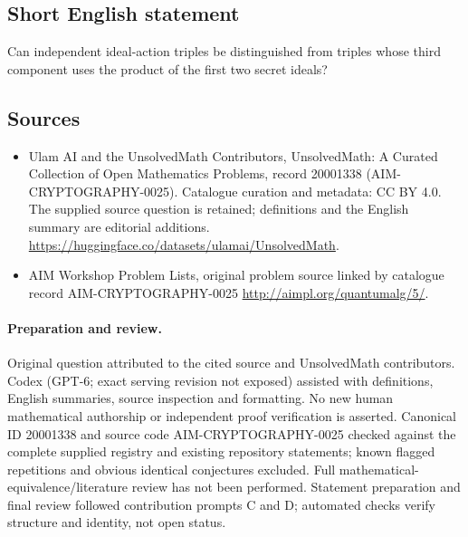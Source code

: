 \documentclass[11pt]{article}
\begin{document}
\subsection{Short English statement}
Can independent ideal-action triples be distinguished from triples whose third component uses the product of the first two secret ideals?
\subsection{Sources}
\begin{itemize}
\item[\hypertarget{source:20001338:1}{S1}] Ulam AI and the UnsolvedMath Contributors, UnsolvedMath: A Curated Collection of Open Mathematics Problems, record 20001338 (AIM-CRYPTOGRAPHY-0025). Catalogue curation and metadata: CC BY 4.0. The supplied source question is retained; definitions and the English summary are editorial additions.
\url{https://huggingface.co/datasets/ulamai/UnsolvedMath}.
\item[\hypertarget{source:20001338:2}{S2}] AIM Workshop Problem Lists, original problem source linked by catalogue record AIM-CRYPTOGRAPHY-0025
\url{http://aimpl.org/quantumalg/5/}.
\end{itemize}
\paragraph{Preparation and review.}
Original question attributed to the cited source and UnsolvedMath contributors. Codex (GPT-6; exact serving revision not exposed) assisted with definitions, English summaries, source inspection and formatting. No new human mathematical authorship or independent proof verification is asserted. Canonical ID 20001338 and source code AIM-CRYPTOGRAPHY-0025 checked against the complete supplied registry and existing repository statements; known flagged repetitions and obvious identical conjectures excluded. Full mathematical-equivalence/literature review has not been performed. Statement preparation and final review followed contribution prompts C and D; automated checks verify structure and identity, not open status.
\label{end:20001338}
\end{document}
